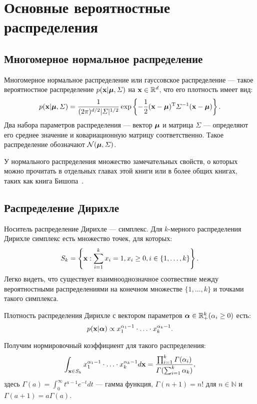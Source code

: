 \section{Основные вероятностные распределения}

\subsection{Многомерное нормальное распределение}
\label{sec:gauss}

Многомерное нормальное распределение или гауссовское распределение --- такое вероятностное распределение $p(\mathbf{x} | \boldsymbol{\mu}, \varSigma)$ на $\mathbf{x} \in \mathbb{R}^d$, что его плотность имеет вид:
\[
p(\mathbf{x} | \boldsymbol{\mu}, \varSigma) = \frac{1}{(2 \pi)^{d / 2} |\varSigma|^{1 / 2}}
\exp \left\{- \frac12 (\mathbf{x} - \boldsymbol{\mu})^{\mathrm{T}} \varSigma^{-1} (\mathbf{x} - \boldsymbol{\mu}) \right\}.
\]
Два набора параметров распределения --- вектор $\boldsymbol{\mu}$ и матрица $\Sigma$ --- определяют его среднее значение и ковариационную матрицу соответственно.
Такое распределение обозначают $\mathcal{N}(\boldsymbol{\mu}, \varSigma)$.

У нормального распределения множество замечательных свойств, о которых можно прочитать в отдельных главах этой книги или в более общих книгах, таких как книга Бишопа~\cite{bishop2006pattern}.

\subsection{Распределение Дирихле}
\label{sec:dirichlet}

Носитель распределение Дирихле --- симплекс.
Для $k$-мерного распределения Дирихле симплекс есть множество точек, для которых:
\[
S_k = \left\{ \mathbf{x}: \sum_{i = 1}^k x_i = 1, x_i \geq 0, i \in \{1, \ldots, k\} \right\}.
\]
Легко видеть, что существует взаимнооднозначное соотвествие между вероятностными распределениями на конечном множестве $\{1, \ldots, k\}$ и точками такого симплекса.

Плотность распределения Дирихле с вектором параметров $\boldsymbol{\alpha} \in \mathbb{R}_+^k (\alpha_i \geq 0)$ есть:
\[
p(\mathbf{x} | \boldsymbol{\alpha}) \propto x_1^{\alpha_1 - 1} \cdot \ldots \cdot x_k^{\alpha_k - 1}.
\]

Получим нормировочный коэффициент для такого распределения:
\[
\int_{\mathbf{x} \in S_k} x_1^{\alpha_1 - 1} \cdot \ldots \cdot x_k^{\alpha_k - 1} d\mathbf{x} = \frac{\prod_{i = 1}^k \varGamma(\alpha_i)}{\varGamma(\sum_{i = 1}^k \alpha_k)},
\]
здесь $\Gamma(a) = \int_{0}^{\infty} t^{a - 1} e^{-t} dt$ --- гамма функция, $\Gamma(n + 1) = n!$ для $n \in \mathbb{N}$ и $\Gamma(a + 1) = a \Gamma(a)$.

